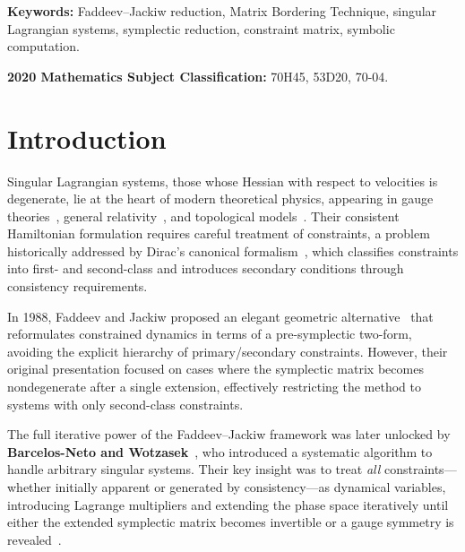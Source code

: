 \documentclass[11pt,a4paper]{article}
\begin{document}
	\noindent\textbf{Keywords:} Faddeev--Jackiw reduction, Matrix Bordering Technique,
	singular Lagrangian systems, symplectic reduction, constraint matrix,
	symbolic computation.
	
	\medskip
	\noindent\textbf{2020 Mathematics Subject Classification:}
	70H45, 53D20, 70-04.
	
	
	\section{Introduction}\label{sec1}
	
	
	
	Singular Lagrangian systems, those whose Hessian with respect to velocities is degenerate, lie at the heart of modern theoretical physics, appearing in gauge theories~\cite{Henneaux1992,Sundermeyer1982}, general relativity~\cite{Arnowitt1962,DeWitt1967}, and topological models~\cite{Witten1989,Schwarz1993}. Their consistent Hamiltonian formulation requires careful treatment of constraints, a problem historically addressed by Dirac's canonical formalism~\cite{Dirac1964}, which classifies constraints into first- and second-class and introduces secondary conditions through consistency requirements.
	
	
	In 1988, Faddeev and Jackiw proposed an elegant geometric alternative~\cite{FaddeevJackiw1988} that reformulates constrained dynamics in terms of a pre-symplectic two-form, avoiding the explicit hierarchy of primary/secondary constraints. However, their original presentation focused on cases where the symplectic matrix becomes nondegenerate after a single extension, effectively restricting the method to systems with only second-class constraints.
	
	
	
	The full iterative power of the Faddeev--Jackiw framework was later unlocked by \textbf{Barcelos-Neto and Wotzasek}~\cite{BarcelosNetoWotzasek1992,BarcelosNetoWotzasek1993}, who introduced a systematic algorithm to handle arbitrary singular systems. Their key insight was to treat \textit{all} constraints—whether initially apparent or generated by consistency—as dynamical variables, introducing Lagrange multipliers and extending the phase space iteratively until either the extended symplectic matrix becomes invertible or a gauge symmetry is revealed~\cite{GitmanTyutin1990,Rothe1997}.
	
	
	
\end{document}

